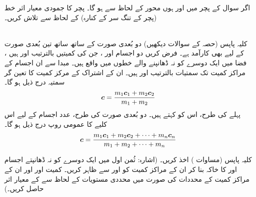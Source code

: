 اگر سوال  کے پچر میں  اور  ہوں محور  کے لحاظ سے  ہو گا۔  پچر کا   جمودی معیار اثر خط  (پچر کے  تنگ سر کے  کنارہ) کے لحاظ سے تلاش کریں۔

\\
کلیہ پاپس  (حصہ  کے سوالات دیکھیں)   دو بُعدی صورت  کے ساتھ ساتھ تین بُعدی صورت  کے لیے بھی کارآمد ہے۔ فرض کریں دو اجسام  اور  ، جن کی  کمیتیں   بالترتیب  اور  ہیں   ، فضا میں ایک دوسرے کو  نہ ڈھانپنے والے خطوں میں واقع  ہیں۔ مبدا سے ان اجسام کے مراکز کمیت تک سمتیات بالترتیب  اور  ہیں۔ ان کے اشتراک    کے مرکز کمیت کا تعین گر سمتیہ درج ذیل ہو گا۔
\begin{align}\label{مساوات_بالکثرت_کلیہ_تین_بعدی_کلیہ_پاپس_الف}
{\ensuremath{{\boldsymbol{c}}}}=\frac{m_1{{\boldsymbol{c}}}_1+m_2{{\boldsymbol{c}}}_2}{m_1+m_2}
\end{align}
پہلے کی طرح، اس کو  کہتے ہیں۔ دو بُعدی صورت کی طرح،   عدد اجسام کے لیے   اس کلیے کا عمومی روپ درج ذیل ہو گا۔
\begin{align}\label{مساوات_بالکثرت_کلیہ_تین_بعدی_کلیہ_پاپس_ب}
{\ensuremath{{\boldsymbol{c}}}}=\frac{m_1{{\boldsymbol{c}}}_1+m_2{{\boldsymbol{c}}}_2+\cdots+m_n{{\boldsymbol{c}}}_n}{m_1+m_2+\cdots+m_n}
\end{align}

کلیہ پاپس (مساوات  ) اخذ کریں۔ (اشارہ: ثُمن اول میں ایک دوسرے کو نہ ڈھانپتے اجسام  اور  کا خاکہ بنا کر ان کے مراکز کمیت کو  اور  سے ظاہر کریں۔ کمیت  اور  اور ان کے مراکز  کمیت کے محددات   کی صورت میں محددی مستویات کے لحاظ سے  کے  معیار اثر حاصل کریں۔) 

